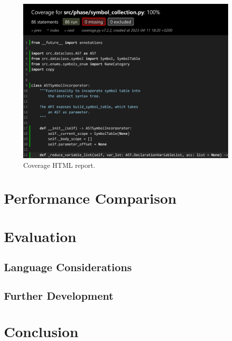 \begin{figure}[H]
    \centering
    \includegraphics[width=1\textwidth]{misc/images/coverage.png}
    \caption{Coverage HTML report.}
\end{figure}


\chapter{Performance Comparison}

\chapter{Evaluation}
\section{Language Considerations}
\section{Further Development}
 
\chapter{Conclusion}

\cleardoublepage
{}
{}
\printbibliography
